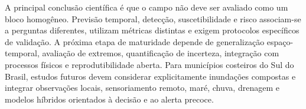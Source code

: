 A principal conclusão científica é que o campo não deve ser avaliado como um bloco homogêneo. Previsão temporal, detecção, suscetibilidade e risco associam-se a perguntas diferentes, utilizam métricas distintas e exigem protocolos específicos de validação. A próxima etapa de maturidade depende de generalização espaço-temporal, avaliação de extremos, quantificação de incerteza, integração com processos físicos e reprodutibilidade aberta. Para municípios costeiros do Sul do Brasil, estudos futuros devem considerar explicitamente inundações compostas e integrar observações locais, sensoriamento remoto, maré, chuva, drenagem e modelos híbridos orientados à decisão e ao alerta precoce.